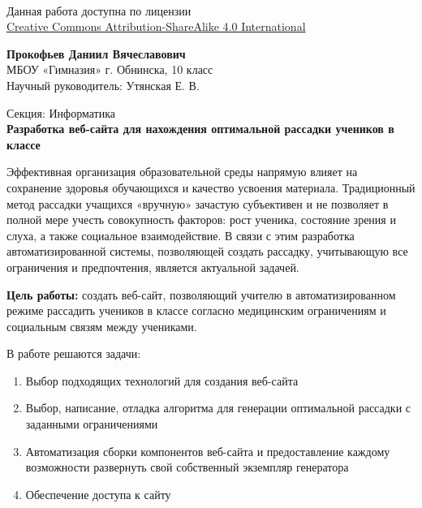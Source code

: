\documentclass[12pt,a4paper]{extarticle} %
\begin{document}
	\noindent
	\begin{minipage}[b]{0.5\textwidth}
		{\begingroup
			
			\color{gray}
			\footnotesize %
			\ccbysa \\ %
			Данная работа доступна по лицензии \\
			\href{https://creativecommons.org/licenses/by-sa/4.0/deed.ru}{Creative Commons Attribution-ShareAlike 4.0 International}
			
			\endgroup}
	\end{minipage}%
	\begin{minipage}[b]{0.5\textwidth}
		\raggedleft
		\textbf{Прокофьев Даниил Вячеславович} \\
		МБОУ «Гимназия» г. Обнинска, 10 класс \\
		Научный руководитель: Утянская Е. В.
	\end{minipage}
	
	\vspace{2cm}
	
	\begin{center}
		Секция: Информатика \\[1cm]
		{\Large \textbf{Разработка веб-сайта для нахождения оптимальной рассадки учеников в классе}}
	\end{center}
	
	Эффективная организация образовательной среды напрямую влияет на сохранение здоровья обучающихся и качество усвоения материала. Традиционный метод рассадки учащихся «вручную» зачастую субъективен и не позволяет в полной мере учесть совокупность факторов: рост ученика, состояние зрения и слуха, а также социальное взаимодействие. В связи с этим разработка автоматизированной системы, позволяющей создать рассадку, учитывающую все ограничения и предпочтения, является актуальной задачей.
	
	\textbf{Цель работы:} создать веб-сайт, позволяющий учителю в автоматизированном режиме рассадить учеников в классе согласно медицинским ограничениям и социальным связям между учениками.
	
	В работе решаются задачи:
	
	\begin{enumerate}[noitemsep]
		\item Выбор подходящих технологий для создания веб-сайта
		\item Выбор, написание, отладка алгоритма для генерации оптимальной рассадки с заданными ограничениями
		\item Автоматизация сборки компонентов веб-сайта и предоставление каждому возможности развернуть свой собственный экземпляр генератора
		\item Обеспечение доступа к сайту
	\end{enumerate}
	
\end{document}
